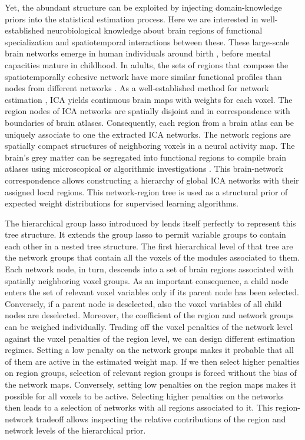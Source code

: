 \documentclass{article}
\begin{document}
Yet, the abundant structure can be exploited by
injecting domain-knowledge priors into the statistical estimation process.
Here we are 
interested in well-established neurobiological knowledge about
brain regions of functional specialization and spatiotemporal interactions
between these.
%
These large-scale brain networks emerge in human individuals around birth
\cite{doria2010}, before mental capacities mature in childhood. 
In adults,
the sets of regions that compose the spatiotemporally cohesive network have more
similar functional profiles than nodes from different networks
\cite{anderson2013}.
As a well-established method for network estimation
\cite{beckmann2005},
ICA yields continuous brain maps with
weights for each voxel. The region nodes of ICA
networks are spatially disjoint and in
correspondence with boundaries of brain atlases.
Consequently,
each region from a brain atlas can be uniquely associate to one
the extracted ICA networks.
%
The network regions are spatially compact structures of
neighboring voxels in a neural activity map.
The brain's grey matter can be segregated into functional regions to
compile brain atlases
using microscopical or algorithmic investigations
\cite{cbp2015review}.
%
This brain-network correspondence
allows constructing a hierarchy of global ICA networks with their
assigned local regions.
This network-region tree is used as a structural prior
of expected weight distributions
for supervised learning algorithms.



The hierarchical group lasso introduced by \cite{jenatton2011multi} lends
itself perfectly to represent this tree structure.
It extends the group lasso
\cite{yuan2006model} to permit variable groups to contain each other
in a nested tree structure.
The first hierarchical level of that tree are
the network groups that contain all
the voxels of the modules associated to them.
Each network node, in turn, descends into a set of
brain regions associated with spatially neighboring voxel groups.
%
As an important consequence,
a child node enters the set of relevant voxel variables only
if its parent node has been selected.
Conversely,
if a parent node is deselected,
also the voxel variables of all child nodes are deselected.
%
Moreover,
the coefficient of the region and network groups can
be weighed individually.
Trading off the voxel penalties of the network level against the
voxel penalties of the region level,
we can design different estimation regimes.
%
Setting a low penalty on the network groups makes it probable
that all of them are active in the estimated weight map. If we then select
higher penalties on region groups, selection of relevant region groups is
forced without the bias of the network maps.
Conversely, setting low penalties on the region maps makes it possible for
all voxels to be active. Selecting higher penalties on the networks then
leads to a selection of networks with all regions associated to it.
%
This region-network tradeoff allows inspecting the relative contributions
of the region and network levels
of the hierarchical prior.
\end{document}
